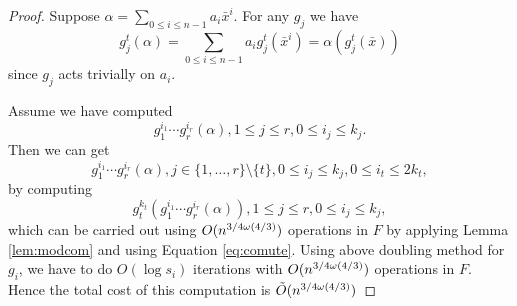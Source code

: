 \begin{proof}
Suppose $\alpha = \sum_{0\leq i \leq n-1} a_i \bar{x}^i$. For any $g_j$ we have 
\begin{equation}\label{eq:comute}
g_j^t(\alpha) = \sum_{0\leq i \leq n-1} a_i g_j^t(\bar{x}^i) = \alpha(g_j^t(\bar{x}))
\end{equation}
since $g_j$ acts trivially on $a_i$. 

Assume we have computed $$g_1^{i_1}\cdots g_r^{i_r}(\alpha) , 1 \leq j \leq r, 
0 \leq i_j \leq k_j.$$
Then we can get $$g_1^{i_1}\cdots g_r^{i_r}(\alpha) , j \in \lbrace 1, \ldots , r \rbrace \setminus \lbrace t \rbrace , 
0 \leq i_j \leq k_j, 0 \leq i_t \leq 2k_t,$$
by computing 
$$g_t^{k_t}(g_1^{i_1}\cdots g_r^{i_r}(\alpha)) , 1 \leq j \leq r, 
0 \leq i_j \leq k_j,$$
which can be carried out using $O(n^{3/4 \omega(4/3)})$ operations in $F$ by applying Lemma \ref{lem:modcom} and using Equation \ref{eq:comute}.
Using above doubling method for $g_i$, we have to do $O(\log s_i)$ iterations with $O(n^{3/4 \omega(4/3)})$ operations in $F$. Hence the total cost of this 
computation is $\tilde{O}(n^{3/4 \omega(4/3)})$

%
%
%
%


\end{proof}
